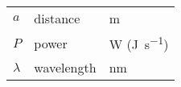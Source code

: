 \documentclass[fleqn]{fcup-thesis}
\begin{document}
\begin{preliminary}
		\begin{symbols}
				\begin{longtable}{lll}
					
					$a$ & distance & \si{\meter} \\
					$P$ & power & \si{\watt} (\si{\joule\per\second}) \\
					
					\addlinespace %
					
					$\lambda$ & wavelength & \si{\nano\meter} \\
				\end{longtable}
		\end{symbols}
		
	\end{preliminary}
	
	
	
	
		
	
	
	
    
	
	
	\appendix
	
	
	
	
	
	
	
	\nocite{} %
	
	
\end{document}
